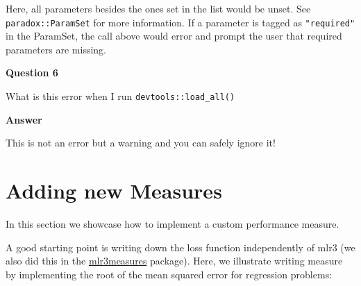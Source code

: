 \documentclass[
]{scrbook}
\newenvironment{Shaded}{\begin{snugshade}}{\end{snugshade}}
\newcommand{\ConstantTok}[1]{\textcolor[rgb]{0.00,0.00,0.00}{#1}}
\newcommand{\ControlFlowTok}[1]{\textcolor[rgb]{0.13,0.29,0.53}{\textbf{#1}}}
\newcommand{\DecValTok}[1]{\textcolor[rgb]{0.00,0.00,0.81}{#1}}
\newcommand{\FunctionTok}[1]{\textcolor[rgb]{0.00,0.00,0.00}{#1}}
\newcommand{\NormalTok}[1]{#1}
\newcommand{\SpecialCharTok}[1]{\textcolor[rgb]{0.00,0.00,0.00}{#1}}
\newcommand{\StringTok}[1]{\textcolor[rgb]{0.31,0.60,0.02}{#1}}
\renewenvironment{Shaded} {\begin{snugshade}\small} {\end{snugshade}}
\begin{document}
Here, all parameters besides the ones set in the list would be unset.
See \texttt{paradox::ParamSet} for more information.
If a parameter is tagged as \texttt{"required"} in the ParamSet, the call above would error and prompt the user that required parameters are missing.

\textbf{Question 6}

What is this error when I run \texttt{devtools::load\_all()}

\begin{Shaded}
\end{Shaded}

\textbf{Answer}

This is not an error but a warning and you can safely ignore it!

\hypertarget{extending-measures}{%
\section{Adding new Measures}\label{extending-measures}}

In this section we showcase how to implement a custom performance measure.

A good starting point is writing down the loss function independently of mlr3 (we also did this in the \href{https://mlr3measures.mlr-org.com}{mlr3measures} package).
Here, we illustrate writing measure by implementing the root of the mean squared error for regression problems:
\end{document}
